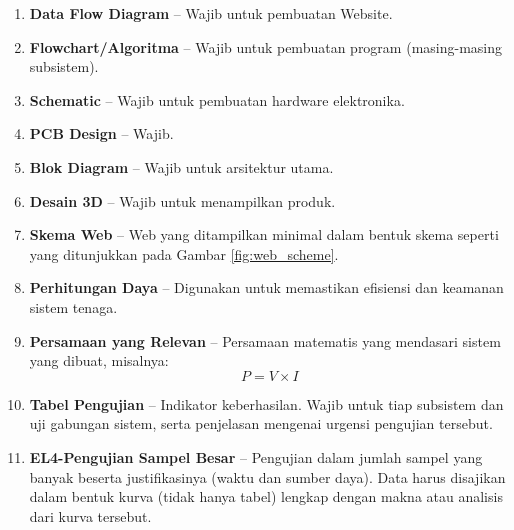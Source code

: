 \documentclass{elsinta}
\begin{document}
\begin{enumerate}
    \item \textbf{Data Flow Diagram} -- Wajib untuk pembuatan Website.
    \item \textbf{Flowchart/Algoritma} -- Wajib untuk pembuatan program (masing-masing subsistem).
    \item \textbf{Schematic} -- Wajib untuk pembuatan hardware elektronika.
    \item \textbf{PCB Design} -- Wajib.
    \item \textbf{Blok Diagram} -- Wajib untuk arsitektur utama.
    \item \textbf{Desain 3D} -- Wajib untuk menampilkan produk.
    \item \textbf{Skema Web} -- Web yang ditampilkan minimal dalam bentuk skema seperti yang ditunjukkan pada Gambar \ref{fig:web_scheme}.
    \item \textbf{Perhitungan Daya} -- Digunakan untuk memastikan efisiensi dan keamanan sistem tenaga.
    \item \textbf{Persamaan yang Relevan} -- Persamaan matematis yang mendasari sistem yang dibuat, misalnya:
    \begin{equation}
        P = V \times I
    \end{equation}
    \item \textbf{Tabel Pengujian} -- Indikator keberhasilan. Wajib untuk tiap subsistem dan uji gabungan sistem, serta penjelasan mengenai urgensi pengujian tersebut.
    \item \textbf{EL4-Pengujian Sampel Besar} -- Pengujian dalam jumlah sampel yang banyak beserta justifikasinya (waktu dan sumber daya). Data harus disajikan dalam bentuk kurva (tidak hanya tabel) lengkap dengan makna atau analisis dari kurva tersebut.
\end{enumerate}
\end{document}
